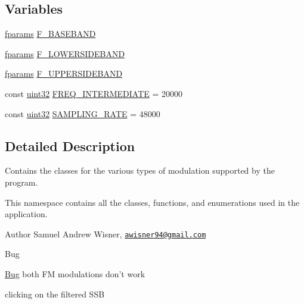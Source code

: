 \subsection*{Variables}
\begin{DoxyCompactItemize}
\item 
\hyperlink{definitions_8hpp_a7615684c2af56be5f302c5b367d71f6b}{fparams} \hyperlink{namespaceradio_a9bd902e9216499953a5906de73dc1796}{F\+\_\+\+B\+A\+S\+E\+B\+A\+N\+D}
\item 
\hyperlink{definitions_8hpp_a7615684c2af56be5f302c5b367d71f6b}{fparams} \hyperlink{namespaceradio_a0ffd57d5a11ff70a1f55dbdc8ebe098d}{F\+\_\+\+L\+O\+W\+E\+R\+S\+I\+D\+E\+B\+A\+N\+D}
\item 
\hyperlink{definitions_8hpp_a7615684c2af56be5f302c5b367d71f6b}{fparams} \hyperlink{namespaceradio_a0ec4548711b6d6ed6867c70b3fc2a413}{F\+\_\+\+U\+P\+P\+E\+R\+S\+I\+D\+E\+B\+A\+N\+D}
\item 
const \hyperlink{definitions_8hpp_a1134b580f8da4de94ca6b1de4d37975e}{uint32} \hyperlink{namespaceradio_aa82ddc6ba206798fd70ffc25665b3cb6}{F\+R\+E\+Q\+\_\+\+I\+N\+T\+E\+R\+M\+E\+D\+I\+A\+T\+E} = 20000
\item 
const \hyperlink{definitions_8hpp_a1134b580f8da4de94ca6b1de4d37975e}{uint32} \hyperlink{namespaceradio_a284213fea4beed2f74bb936927cbe654}{S\+A\+M\+P\+L\+I\+N\+G\+\_\+\+R\+A\+T\+E} = 48000
\end{DoxyCompactItemize}


\subsection{Detailed Description}
Contains the classes for the various types of modulation supported by the program. 

This namespace contains all the classes, functions, and enumerations used in the application.

\begin{DoxyAuthor}{Author}
Samuel Andrew Wisner, \href{mailto:awisner94@gmail.com}{\tt awisner94@gmail.\+com} 
\end{DoxyAuthor}
\begin{DoxyRefDesc}{Bug}
\item[\hyperlink{bug__bug000004}{Bug}]both F\+M modulations don't work 

clicking on the filtered S\+S\+B \end{DoxyRefDesc}


